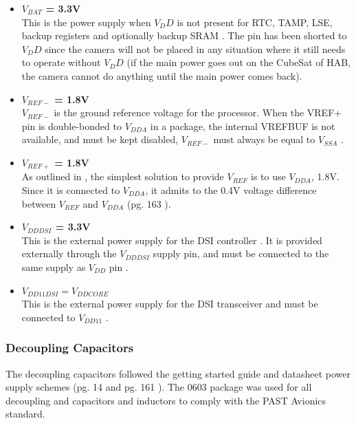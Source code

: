 \begin{itemize}
        \item \textbf{$V_{BAT}$ = 3.3V} \\
        This is the power supply when $V_DD$ is not present for RTC, TAMP, LSE, backup registers and optionally backup SRAM \cite{u5-getting-started}. The pin has been shorted to $V_DD$ since the camera will not be placed in any situation where it still needs to operate without $V_DD$ (if the main power goes out on the CubeSat of HAB, the camera cannot do anything until the main power comes back).

        \item \textbf{$V_{REF-}$ = 1.8V} \\
        $V_{REF-}$ is the ground reference voltage for the processor. When the VREF+ pin is double-bonded to $V_{DDA}$ in a package, the internal VREFBUF is not available, and must be kept disabled, $V_{REF-}$ must always be equal to $V_{SSA}$ \cite{u5-getting-started}.

        \item \textbf{$V_{REF+}$ = 1.8V} \\
        As outlined in \cite{stm-power}, the simplest solution to provide $V_{REF}$ is to use $V_{DDA}$, 1.8V. Since it is connected to $V_{DDA}$, it admits to the 0.4V voltage difference between $V_{REF}$ and $V_{DDA}$ (pg. 163 \cite{u5-datasheet}).

        \item \textbf{$V_{DDDSI}$ = 3.3V} \\
        This is the external power supply for the DSI controller \cite{u5-getting-started}. It is provided externally through the $V_{DDDSI}$ supply pin, and must be connected to the same supply as $V_{DD}$ pin \cite{u5-getting-started}.

        \item \textbf{$V_{DD11DSI} = V_{DDCORE}$} \\
        This is the external power supply for the DSI transceiver and must be connected to $V_{DD11}$ \cite{u5-getting-started}.
    \end{itemize}
\subsubsection{Decoupling Capacitors}
    The decoupling capacitors followed the getting started guide and datasheet power supply schemes (pg. 14 \cite{u5-getting-started} and pg. 161 \cite{u5-datasheet}).
    The 0603 package was used for all decoupling and capacitors and inductors to comply with the PAST Avionics standard.
     
